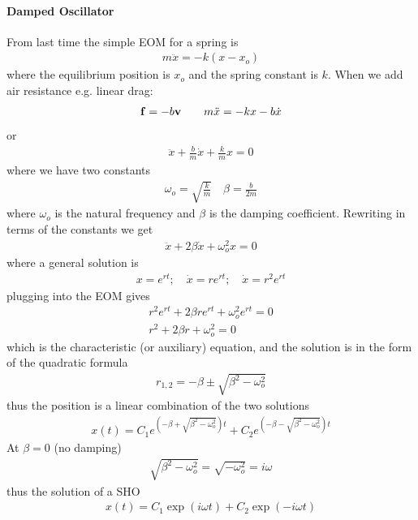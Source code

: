 \documentclass[../main.tex]{subfiles}
\begin{document}
\paragraph{Damped Oscillator} From last time the simple EOM for a spring is
\begin{align*}
    m \ddot x = - k (x - x_o)
\end{align*}
where the equilibrium position is $x_o$ and the spring constant is $k$. When we add air resistance
e.g. linear drag:
\begin{align*} 
    \vb{f} = -b \vb{v} \qquad m\ddot x = -kx - b \dot x
\end{align*}
or
\begin{align*}
    \ddot x + \frac{b}{m} \dot x + \frac{k}{m} x = 0
\end{align*}
where we have two constants
\begin{align*}
    \omega_o = \sqrt{\frac{k}{m}} \quad \beta = \frac{b}{2m}
\end{align*}
where $\omega_o$ is the natural frequency and $\beta$ is the damping coefficient. Rewriting in terms
of the constants we get
\begin{align*}
    \ddot x + 2 \beta \dot x + \omega_o^2 x = 0
\end{align*}
where a general solution is
\begin{align*}
    x = e^{rt}; \quad \dot x = r e^{rt}; \quad \dot x = r^2 e^{rt}
\end{align*}
plugging into the EOM gives
\begin{align*}
    r^2 e^{rt} + 2 \beta r e^{rt} + \omega_o^2 e^{rt} = 0 \\
    r^2 + 2 \beta r + \omega_o^2 = 0
\end{align*}
which is the characteristic (or auxiliary) equation, and the solution is in the form of 
the quadratic formula
\begin{align*}
    r_{1,2} = -\beta \pm \sqrt{\beta^2 - \omega_o^2}
\end{align*}
thus the position is a linear combination of the two solutions
\begin{align*}
    x(t) = C_1 e^{(-\beta + \sqrt{\beta^2 - \omega_o^2}) t} 
        + C_2 e^{(-\beta - \sqrt{\beta^2 - \omega_o^2}) t}
\end{align*}
At $\beta = 0$ (no damping)
\begin{align*}
    \sqrt{\beta^2 - \omega_o^2} = \sqrt{-\omega_o^2} = i \omega
\end{align*}
thus the solution of a SHO
\begin{align*}
    x(t) = C_1 \exp(i \omega t) + C_2 \exp(-i \omega t)
\end{align*}
\end{document}
